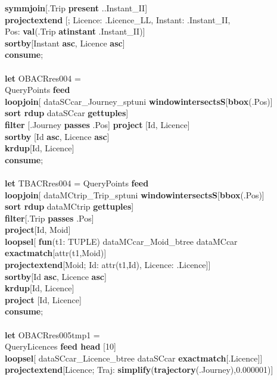 \documentclass[a4paper]{article}
\newcommand{\op}[1]{\textbf{#1}}
\begin{document}
\begin{scriptsize}
\begin{tabbing}
\>\op{symmjoin}[.Trip \op{present} ..Instant\_II]\\
\>\op{projectextend} [; Licence: .Licence\_LL, Instant: .Instant\_II,\\
\>\>\>\>Pos: \op{val}(.Trip \op{atinstant} .Instant\_II)]\\
\>\op{sortby}[Instant \op{asc}, Licence \op{asc}]\\
\op{consume};\\
\\
\op{let} OBACRres004 =\\
\>QueryPoints \op{feed}\\
\>\op{loopjoin}[ dataSCcar\_Journey\_sptuni \op{windowintersectsS}[\op{bbox}(.Pos)]\\
\>\>\op{sort rdup} dataSCcar \op{gettuples}]\\
\>\op{filter} [.Journey \op{passes} .Pos] \op{project} [Id, Licence]\\
\>\op{sortby} [Id \op{asc}, Licence \op{asc}]\\
\>\op{krdup}[Id, Licence]\\
\op{consume};\\
\\
\op{let} TBACRres004 = QueryPoints \op{feed}\\
\>\op{loopjoin}[ dataMCtrip\_Trip\_sptuni \op{windowintersectsS}[\op{bbox}(.Pos)]\\
\>\>\op{sort rdup} dataMCtrip \op{gettuples}]\\
\>\op{filter}[.Trip \op{passes} .Pos]\\
\>\op{project}[Id, Moid]\\
\>\op{loopsel}[ \op{fun}(t1: TUPLE) dataMCcar\_Moid\_btree dataMCcar \op{exactmatch}[attr(t1,Moid)]\\
\>\>\op{projectextend}[Moid; Id: attr(t1,Id), Licence: .Licence]]\\
\>\op{sortby}[Id \op{asc}, Licence \op{asc}]\\
\>\op{krdup}[Id, Licence]\\
\>\op{project} [Id, Licence]\\
\op{consume};\\
\\
\op{let} OBACRres005tmp1 =\\
\>QueryLicences \op{feed head} [10]\\
\>\op{loopsel}[ dataSCcar\_Licence\_btree dataSCcar \op{exactmatch}[.Licence]]\\
\>\op{projectextend}[Licence; Traj: \op{simplify}(\op{trajectory}(.Journey),0.000001)]\\

\end{tabbing}
\end{scriptsize}
\end{document}
